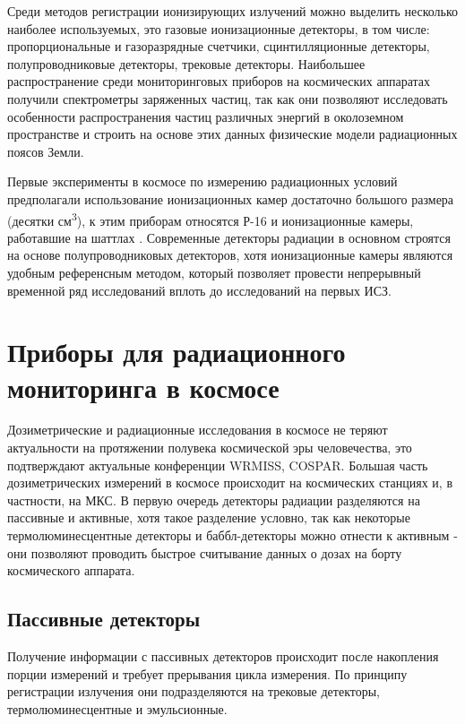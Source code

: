 Среди методов регистрации ионизирующих излучений можно выделить несколько наиболее используемых, это газовые ионизационные детекторы, в том числе: пропорциональные и газоразрядные счетчики, сцинтилляционные детекторы, полупроводниковые детекторы, трековые детекторы. Наибольшее распространение среди мониторинговых приборов на космических аппаратах получили спектрометры заряженных частиц, так как они позволяют исследовать особенности распространения частиц различных энергий в околоземном пространстве и строить на основе этих данных физические модели радиационных поясов Земли.

Первые эксперименты в космосе по измерению радиационных условий предполагали использование ионизационных камер достаточно большого размера (десятки см\textsuperscript{3}), к этим приборам относятся Р-16 \cite{Mitricas2002} и ионизационные камеры, работавшие на шаттлах \cite{Dorman2004}. Современные детекторы радиации в основном строятся на основе полупроводниковых детекторов, хотя ионизационные камеры являются удобным референсным методом, который позволяет провести непрерывный временной ряд исследований вплоть до исследований на первых ИСЗ.


\section{Приборы для радиационного мониторинга в космосе} \label{sect1_3}

Дозиметрические и радиационные исследования в космосе не теряют актуальности на протяжении полувека космической эры человечества, это подтверждают актуальные  конференции WRMISS, COSPAR. Большая часть дозиметрических измерений в космосе происходит на космических станциях и, в частности, на МКС. 
В первую очередь детекторы радиации разделяются на пассивные и активные, хотя такое разделение условно, так как некоторые термолюминесцентные детекторы и баббл-детекторы можно отнести к активным - они позволяют проводить быстрое считывание данных о дозах на борту космического аппарата. 

\subsection{Пассивные детекторы} \label{subsect1_3_1}

Получение информации с пассивных детекторов происходит после накопления порции измерений и требует прерывания цикла измерения. По принципу регистрации излучения они подразделяются на трековые детекторы, термолюминесцентные \cite{Luszik-Bhadra1999,Kulkarni2011} и эмульсионные. 


